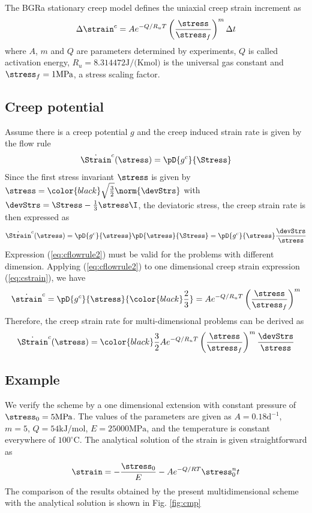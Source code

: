 
 The BGRa stationary creep model defines
 the uniaxial creep strain increment as
\begin{equation}
\Delta\strain^c=Ae^{-Q/R_uT}\left(\dfrac{\stress}{\stress_f}\right)^m \Delta t
 \label{eq:cstrain}
\end{equation}
where $A$, $m$ and $Q$ are parameters determined by experiments, $Q$ is called activation energy,
 $R_u=8.314472 \mbox{J/(Kmol)}$ is the universal gas constant and $\stress_f=1\mbox{MPa}$, a stress scaling factor.
\subsection*{Creep potential}
Assume there is a creep potential $g$ and the creep induced strain rate is given by the flow rule
\begin{gather}
\dot \Strain^c (\stress)= \pD{g^c}{\Stress}
\label{eq:cflowrule}
\end{gather}
Since the first stress invariant $\stress$ is given by $\stress={\color{black}\sqrt{{\frac{3}{2}}}}\norm{\devStrs}$ with $\devStrs = \Stress-\frac{1}{3}\stress\I$, the deviatoric stress,
the creep strain rate is then expressed as
\begin{gather}
\dot \Strain^c (\stress)= \pD{g^c}{\stress}\pD{\stress}{\Stress}=\pD{g^c}{\stress}\dfrac{\devStrs}{\stress}
\label{eq:cflowrule2}
\end{gather}
Expression (\ref{eq:cflowrule2}) must be valid for the problems with different dimension. Applying (\ref{eq:cflowrule2})
to one dimensional creep strain expression (\ref{eq:cstrain}), we have
\begin{gather}
\dot \strain^c = \pD{g^c}{\stress}{\color{black}\dfrac{2}{3}}=Ae^{-Q/R_uT}\left(\dfrac{\stress}{\stress_f}\right)^m
\label{eq:cflowrule3}
\end{gather}
Therefore, the creep strain rate for multi-dimensional problems can be derived as
\begin{gather}
 \dot \Strain^c (\stress)={\color{black}\dfrac{3}{2}}Ae^{-Q/R_uT}\left(\dfrac{\stress}{\stress_f}\right)^m\dfrac{\devStrs}{\stress}
\label{eq:crpstrain}
\end{gather}
\subsection*{Example}
We verify the scheme by a one dimensional extension with constant pressure of $\stress_0=\mbox{5MPa}$. The values of the parameters are given as
$A=0.18 \mbox{d}^{-1}$, $m=5$, $Q=54\mbox{kJ/mol}$, $E=25000\mbox{MPa}$, and the temperature is constant everywhere of $100^{\circ}\mbox{C}$.
The analytical solution of the strain is given straightforward as
\begin{gather}
\strain=-\dfrac{\stress_0}{E}-Ae^{-Q/RT}\stress_0^n t
\label{eq:cflowrule}
\end{gather}
The comparison of the results obtained by the present multidimensional scheme with the analytical solution is shown in Fig. \ref{fig:cmp}

